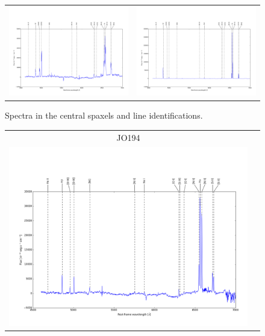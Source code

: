 \documentclass[fleqn,usenatbib]{mnras}
\begin{document}
\begin{figure}
\begin{tabular}{cc}
		\includegraphics[width=.5\linewidth]{Plots/JW100_nucleus}&
		\includegraphics[width=.5\linewidth]{Plots/JO175_nucleus} \\
	\end{tabular} 
	\caption{Spectra in the central spaxels and line identifications.\label{fig:spectra}}
\end{figure}


\begin{figure}
	\begin{tabular}{cc}		
		JO194 & \\		
		\includegraphics[width=.5\linewidth]{Plots/JO194_nucleus}& \\
	\end{tabular} 
	\contcaption{}
\end{figure}
\end{document}
